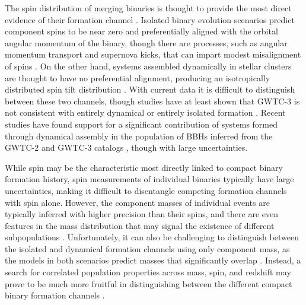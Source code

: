 The spin distribution of merging binaries is thought to provide the most direct evidence of their formation channel \citep{2017Natur.548..426F,2018ApJ...854L...9F}. Isolated binary evolution scenarios predict component spins to be near zero  and preferentially aligned with the orbital angular momentum of the binary, though there are processes, such as angular momentum transport and supernova kicks, that can impart modest misalignment of spins \citep{2203.02515, 1706.07053, 10.1051/0004-6361/201936204, 10.1051/0004-6361/202039804}. On the other hand, systems assembled dynamically in stellar clusters are thought to have no preferential alignment, producing an isotropically distributed spin tilt distribution \citep{1609.05916,10.1103/PhysRevD.100.043027}. With current data it is difficult to distinguish between these two channels, though studies have at least shown that GWTC-3 is not consistent with entirely dynamical or entirely isolated formation \citep{2021arXiv211103634T,2022ApJ...937L..13C,2022arXiv220902206T,2022arXiv221012834E,10.3847/2041-8213/ac86c4,2011.09570}. Recent studies have found support for a significant contribution of systems formed through dynamical assembly in the population of BBHs inferred from the GWTC-2 and GWTC-3 catalogs \citep{2021ApJ...913L...7A,2021PhRvD.104h3010R,2021arXiv211103634T,2022ApJ...937L..13C,2021ApJ...921L..15G,2022arXiv220902206T,2022arXiv220906978V,2022arXiv221012834E}, though with large uncertainties.

While spin may be the characteristic most directly linked to compact binary formation history, spin measurements of individual binaries typically have large uncertainties, making it difficult to disentangle competing formation channels with spin alone. However, the component masses of individual events are typically inferred with higher precision than their spins, and there are even features in the mass distribution that may signal the existence of different subpopulations \citep{2021ApJ...913L..19T,2022ApJ...924..101E,2021arXiv211103634T,2022ApJ...928..155T,2022arXiv221012834E}. Unfortunately, it can also be challenging to distinguish between the isolated and dynamical formation channels using only component mass, as the models in both scenarios predict masses that significantly overlap \citep{1609.05916}. Instead, a search for correlated population properties across mass, spin, and redshift may prove to be much more fruitful in distinguishing between the different compact binary formation channels \citep{2021ApJ...912...98F,2021ApJ...922L...5C,2022ApJ...931...17V,2022ApJ...932L..19B}.

